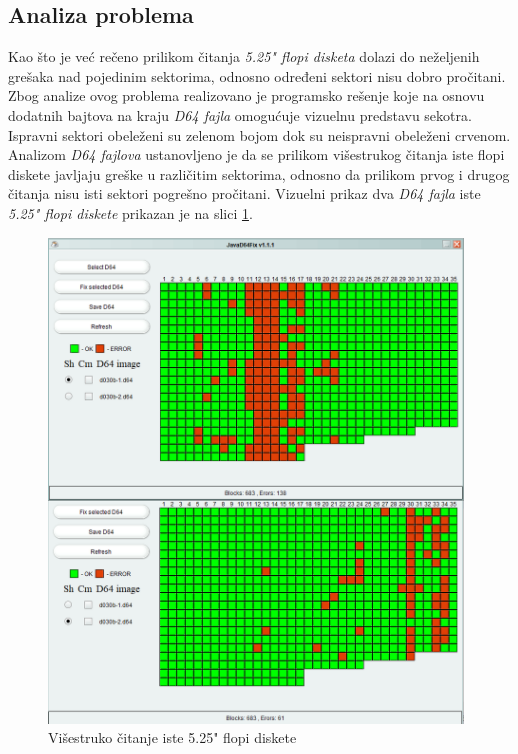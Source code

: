 \subsection{Analiza problema}

Kao što je već rečeno prilikom čitanja \textit{5.25" flopi disketa} dolazi do  \newline neželjenih grešaka nad pojedinim sektorima, odnosno određeni sektori nisu dobro pročitani. Zbog analize ovog problema realizovano je programsko rešenje koje na osnovu dodatnih bajtova na kraju \textit{D64 fajla} omogućuje vizuelnu predstavu sekotra. Ispravni sektori obeleženi su zelenom bojom dok su neispravni obeleženi crvenom. Analizom  \textit{D64 fajlova} ustanovljeno je da se prilikom višestrukog čitanja iste flopi diskete javljaju greške u različitim sektorima, odnosno da prilikom prvog i drugog čitanja nisu isti sektori pogrešno pročitani. Vizuelni prikaz dva  \textit{D64 fajla}  iste \textit{5.25" flopi diskete} prikazan je na slici \ref{img:visestrukoCitanje}.

\begin{figure}[ht]
\begin{center}
\includegraphics[width=11cm]{img/visestrukoCitanje.png}
\caption{Višestruko čitanje iste 5.25" flopi diskete}
\label{img:visestrukoCitanje}
\end{center}
\end{figure}